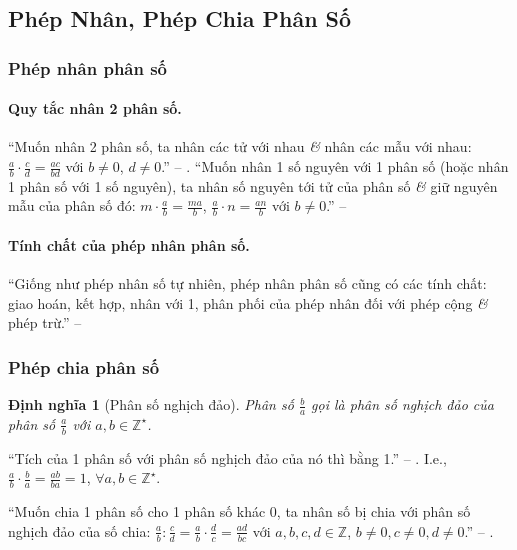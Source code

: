 \documentclass{article}
\numberwithin{equation}{section}
\newtheorem{dinhnghia}{Định nghĩa}[section]
\begin{document}
\subsection{Phép Nhân, Phép Chia Phân Số}

\subsubsection{Phép nhân phân số}

\paragraph{Quy tắc nhân 2 phân số.} ``Muốn nhân 2 phân số, ta nhân các tử với nhau \textit{\&} nhân các mẫu với nhau: $\frac{a}{b}\cdot\frac{c}{d} = \frac{ac}{bd}$ với $b\ne 0$, $d\ne 0$.'' -- \cite[p. 40]{SGK_Toan_6_Canh_Dieu_tap_2}. ``Muốn nhân 1 số nguyên với 1 phân số (hoặc nhân 1 phân số với 1 số nguyên), ta nhân số nguyên tới tử của phân số \textit{\&} giữ nguyên mẫu của phân số đó: $m\cdot\frac{a}{b} = \frac{ma}{b}$, $\frac{a}{b}\cdot n = \frac{an}{b}$ với $b\ne 0$.'' -- \cite[p. 41]{SGK_Toan_6_Canh_Dieu_tap_2}

\paragraph{Tính chất của phép nhân phân số.} ``Giống như phép nhân số tự nhiên, phép nhân phân số cũng có các tính chất: giao hoán, kết hợp, nhân với 1, phân phối của phép nhân đối với phép cộng \textit{\&} phép trừ.'' -- \cite[p. 41]{SGK_Toan_6_Canh_Dieu_tap_2}

\subsubsection{Phép chia phân số}
 
\begin{dinhnghia}[Phân số nghịch đảo]
	Phân số $\frac{b}{a}$ gọi là \emph{phân số nghịch đảo} của phân số $\frac{a}{b}$ với $a,b\in\mathbb{Z}^\star$.
\end{dinhnghia}
``Tích của 1 phân số với phân số nghịch đảo của nó thì bằng 1.'' -- \cite[p. 42]{SGK_Toan_6_Canh_Dieu_tap_2}. I.e., $\frac{a}{b}\cdot\frac{b}{a} = \frac{ab}{ba} = 1$, $\forall a,b\in\mathbb{Z}^\star$.

``Muốn chia 1 phân số cho 1 phân số khác 0, ta nhân số bị chia với phân số nghịch đảo của số chia: $\frac{a}{b}:\frac{c}{d} = \frac{a}{b}\cdot\frac{d}{c} = \frac{ad}{bc}$ với $a,b,c,d\in\mathbb{Z}$, $b\ne 0,c\ne 0,d\ne 0$.'' -- \cite[p. 42]{SGK_Toan_6_Canh_Dieu_tap_2}.
\end{document}
